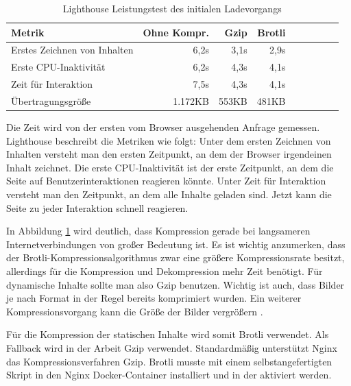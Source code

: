 \begin{table}[h]
\begin{center}
\begin{tabular}{l*{8}{r}}
Metrik & Ohne Kompr. & Gzip & Brotli \\
\hline
Erstes Zeichnen von Inhalten & 6,2s  & 3,1s & 2,9s \\
Erste CPU-Inaktivität        & 6,2s  & 4,3s & 4,1s \\
Zeit für Interaktion         & 7,5s  & 4,3s & 4,1s \\
Übertragungsgröße            & 1.172KB  &  553KB & 481KB \\
\end{tabular}
\end{center}
\caption{Lighthouse Leistungstest des initialen Ladevorgangs}
\label{tab:lighthouseleistungstestdesinitialenladevorgangs}
\end{table}

Die Zeit wird von der ersten vom Browser ausgehenden Anfrage gemessen.
Lighthouse beschreibt die Metriken wie folgt: Unter dem ersten Zeichnen
von Inhalten versteht man den ersten Zeitpunkt, an dem der Browser
irgendeinen Inhalt zeichnet. Die erste CPU-Inaktivität ist
der erste Zeitpunkt, an dem die Seite auf Benutzerinteraktionen reagieren könnte.
Unter Zeit für Interaktion versteht man den Zeitpunkt, an dem alle Inhalte geladen sind.
Jetzt kann die Seite zu jeder Interaktion schnell reagieren.\cite{WhatPerformanceMetricsMeasure}

In Abbildung \ref{tab:lighthouseleistungstestdesinitialenladevorgangs} wird deutlich,
dass Kompression gerade bei langsameren Internetverbindungen von großer Bedeutung ist.
Es ist wichtig anzumerken, dass der Brotli-Kompressionsalgorithmus zwar eine größere
Kompressionsrate besitzt, allerdings für die Kompression und Dekompression mehr Zeit
benötigt.\cite{CompressionBenchmark} Für dynamische Inhalte sollte man also Gzip
benutzen. Wichtig ist auch, dass Bilder je nach Format in der Regel bereits komprimiert wurden.
Ein weiterer Kompressionsvorgang kann die Größe der Bilder vergrößern \cite{CloudFlareCompressionDiscussion}.

Für die Kompression der statischen Inhalte wird somit Brotli verwendet.
Als Fallback wird in der Arbeit Gzip verwendet. Standardmäßig unterstützt Nginx
das Kompressionsverfahren Gzip. Brotli musste mit einem selbstangefertigten Skript in
den Nginx Docker-Container installiert und in der  aktiviert werden.

